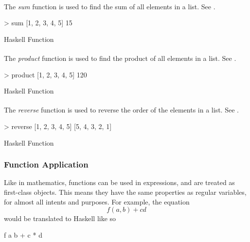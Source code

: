 \paragraph{\texorpdfstring{}{\texttt{sum}}}\label{par:List_Sum_Function}
The \emph{sum} function is used to find the sum of all elements in a list.
See .
\begin{listing}[h!tbp]
\begin{haskellsource}
  > sum [1, 2, 3, 4, 5]
  15
\end{haskellsource}
\caption{Haskell  Function}
\label{lst:List_Sum_Function}
\end{listing}

\paragraph{\texorpdfstring{}{\texttt{product}}}\label{par:List_Product_Function}
The \emph{product} function is used to find the product of all elements in a list.
See .
\begin{listing}[h!tbp]
\begin{haskellsource}
  > product [1, 2, 3, 4, 5]
  120
\end{haskellsource}
\caption{Haskell  Function}
\label{lst:List_Product_Function}
\end{listing}

\paragraph{\texorpdfstring{}{\texttt{reverse}}}\label{par:List_Reverse_Function}
The \emph{reverse} function is used to reverse the order of the elements in a list.
See .
\begin{listing}[h!tbp]
\begin{haskellsource}
  > reverse [1, 2, 3, 4, 5]
  [5, 4, 3, 2, 1]
\end{haskellsource}
\caption{Haskell  Function}
\label{lst:List_Reverse_Function}
\end{listing}

\subsubsection{Function Application}\label{subsubsec:Function_Application}
Like in mathematics, functions can be used in expressions, and are treated as first-class objects.
This means they have the same properties as regular variables, for almost all intents and purposes.
For example, the equation
\begin{equation*}
  f(a,b) + cd
\end{equation*}
would be translated to Haskell like so
\begin{haskellsource}
  f a b + c * d
\end{haskellsource}

